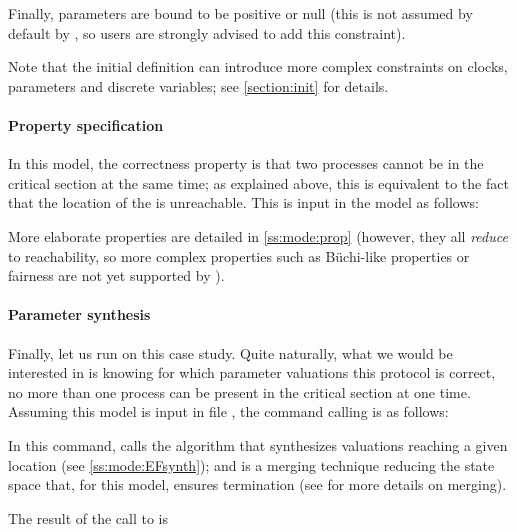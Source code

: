 Finally, parameters are bound to be positive or null (this is not assumed by default by \imitator{}, so users are strongly advised to add this constraint).

Note that the initial definition can introduce more complex constraints on clocks, parameters and discrete variables; see \cref{section:init} for details.


\paragraph{Property specification}
In this model, the correctness property is that two processes cannot be in the critical section at the same time; as explained above, this is equivalent to the fact that the  location of the  \IPTA{} is unreachable.
This is input in the model as follows:
\begin{center}
\end{center}
More elaborate properties are detailed in \cref{ss:mode:prop} (however, they all \emph{reduce} to reachability, so more complex properties such as Büchi-like properties or fairness are not yet supported by \imitator{}).


\paragraph{Parameter synthesis}
Finally, let us run \imitator{} on this case study.
Quite naturally, what we would be interested in is knowing for which parameter valuations this protocol is correct, \ie{} no more than one process can be present in the critical section at one time.
Assuming this model is input in file , the command calling \imitator{} is as follows:


In this command,  calls the algorithm \EFsynth{} that synthesizes valuations reaching a given location (see \cref{ss:mode:EFsynth}); and  is a merging technique reducing the state space that, for this model, ensures termination (see \cite{AFS13atva} for more details on merging).

The result of the call to \imitator{} is


